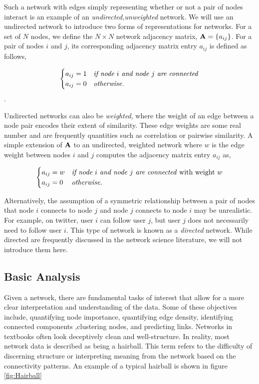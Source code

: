 Such a network with edges simply representing whether or not a pair of nodes interact is an example of an \emph{undirected,unweighted} network. We will use an undirected network to introduce two forms of representations for networks. For a set of $N$ nodes, we define the $N \times N$ network adjacency matrix, ${\bf A}=\{a_{ij}\}$. For a pair of nodes $i$ and $j$, its corresponding adjacency matrix entry $a_{ij}$ is defined as follows,

\[ \begin{cases} 
     a_{ij}=1 & \text{\emph{if node $i$ and node $j$ are connected}} \\
      a_{ij}=0 & \text{\emph{otherwise}}.
         \end{cases}
\].

Undirected networks can also be \emph{weighted}, where the weight of an edge between a node pair encodes their extent of similarity. These edge weights are some real number and are frequently quantities such as correlation or pairwise similarity. A simple extension of ${\bf A}$ to an undirected, weighted network where $w$ is the edge weight between nodes $i$ and $j$ computes the adjacency matrix entry $a_{ij}$ as, 

\[ \begin{cases} 
     a_{ij}=w & \text{\emph{if node $i$ and node $j$ are connected} with weight $w$} \\
      a_{ij}=0 & \text{\emph{otherwise}}.
         \end{cases}
\]

Alternatively, the assumption of a symmetric relationship between a pair of nodes that node $i$ connects to node $j$ and node $j$ connects to node $i$  may be unrealistic. For example, on twitter, user $i$ can follow user $j$, but user $j$ does not necessarily need to follow user $i$. This type of network is known as a \emph{directed} network. While directed are frequently discussed in the network science literature, we will not introduce them here.  

\subsection{Basic Analysis}
Given a network, there are fundamental tasks of interest that allow for a more clear interpretation and understanding of the data. Some of these objectives include, quantifying node importance, quantifying edge density, identifying connected components ,clustering nodes, and predicting links. Networks in textbooks often look deceptively clean and well-structure. In reality, most network data is described as being a hairball. This term refers to the difficulty of discerning structure or interpreting meaning from the network based on the connectivity patterns. An example of a typical hairball is shown in figure \ref{fig:Hairball}

